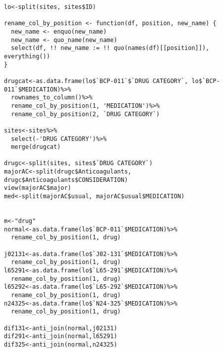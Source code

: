 \documentclass[]{article}
\begin{document}
\begin{verbatim}
lo<-split(sites, sites$ID)

rename_col_by_position <- function(df, position, new_name) {
  new_name <- enquo(new_name)
  new_name <- quo_name(new_name)
  select(df, !! new_name := !! quo(names(df)[[position]]), everything())
}
  
drugcat<-as.data.frame(lo$`BCP-011`$`DRUG CATEGORY`, lo$`BCP-011`$MEDICATION)%>%
  rownames_to_column()%>%
  rename_col_by_position(1, 'MEDICATION')%>%
  rename_col_by_position(2, `DRUG CATEGORY`)

sites<-sites%>%
  select(-'DRUG CATEGORY')%>%
  merge(drugcat)

drugc<-split(sites, sites$`DRUG CATEGORY`)
majorAC<-split(drugc$Anticoagulants, drugc$Anticoagulants$CONSIDERATION)
view(majorAC$major)
med<-split(majorAC$usual, majorAC$usual$MEDICATION)


m<-"drug"
normal<-as.data.frame(lo$`BCP-011`$MEDICATION)%>%
  rename_col_by_position(1, drug)

j02131<-as.data.frame(lo$`J02-131`$MEDICATION)%>%
  rename_col_by_position(1, drug)
l65291<-as.data.frame(lo$`L65-291`$MEDICATION)%>%
  rename_col_by_position(1, drug)
l65292<-as.data.frame(lo$`L65-292`$MEDICATION)%>%
  rename_col_by_position(1, drug)
n24325<-as.data.frame(lo$`N24-325`$MEDICATION)%>%
  rename_col_by_position(1, drug)

dif131<-anti_join(normal,j02131)
dif291<-anti_join(normal,l65291)
dif325<-anti_join(normal,n24325)
\end{verbatim}
\end{document}
